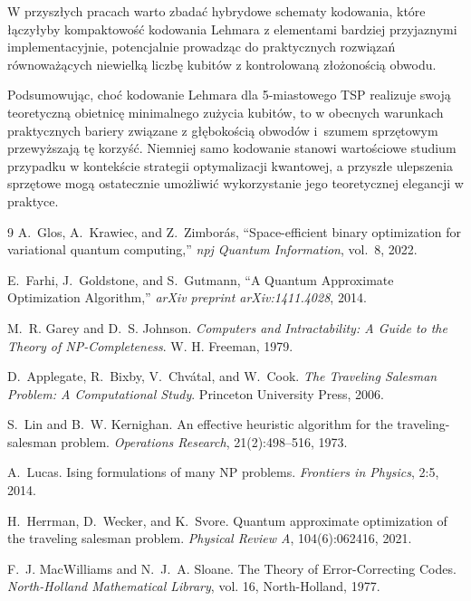 W przyszłych pracach warto zbadać hybrydowe schematy kodowania, które łączyłyby kompaktowość kodowania Lehmara z elementami bardziej przyjaznymi implementacyjnie, potencjalnie prowadząc do praktycznych rozwiązań równoważących niewielką liczbę kubitów z kontrolowaną złożonością obwodu.

Podsumowując, choć kodowanie Lehmara dla 5-miastowego TSP realizuje swoją teoretyczną obietnicę minimalnego zużycia kubitów, to w obecnych warunkach praktycznych bariery związane z głębokością obwodów i~szumem sprzętowym przewyższają tę korzyść. Niemniej samo kodowanie stanowi wartościowe studium przypadku w kontekście strategii optymalizacji kwantowej, a przyszłe ulepszenia sprzętowe mogą ostatecznie umożliwić wykorzystanie jego teoretycznej elegancji w praktyce.

\begin{thebibliography}{9}
A.~Glos, A.~Krawiec, and Z.~Zimborás,
\newblock ``Space-efficient binary optimization for variational quantum computing,''
\newblock \textit{npj Quantum Information}, vol.~8, 2022.

E.~Farhi, J.~Goldstone, and S.~Gutmann,
\newblock ``A Quantum Approximate Optimization Algorithm,''
\newblock \textit{arXiv preprint arXiv:1411.4028}, 2014.

M.~R. Garey and D.~S. Johnson.
\newblock \emph{Computers and Intractability: A Guide to the Theory of NP-Completeness}.
\newblock W. H. Freeman, 1979.

D.~Applegate, R.~Bixby, V.~Chvátal, and W.~Cook.
\newblock \emph{The Traveling Salesman Problem: A Computational Study}.
\newblock Princeton University Press, 2006.

S.~Lin and B.~W. Kernighan.
\newblock An effective heuristic algorithm for the traveling-salesman problem.
\newblock \emph{Operations Research}, 21(2):498–516, 1973.

A.~Lucas.
\newblock Ising formulations of many NP problems.
\newblock \emph{Frontiers in Physics}, 2:5, 2014.

H.~Herrman, D.~Wecker, and K.~Svore.
\newblock Quantum approximate optimization of the traveling salesman problem.
\newblock \emph{Physical Review A}, 104(6):062416, 2021.

F.~J. MacWilliams and N.~J.~A. Sloane.
\newblock The Theory of Error-Correcting Codes.
\newblock \emph{North-Holland Mathematical Library}, vol. 16, North-Holland, 1977.

\end{thebibliography}

